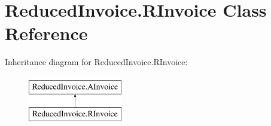 \hypertarget{class_reduced_invoice_1_1_r_invoice}{\section{Reduced\-Invoice.\-R\-Invoice Class Reference}
\label{class_reduced_invoice_1_1_r_invoice}
}
Inheritance diagram for Reduced\-Invoice.\-R\-Invoice\-:\begin{figure}[H]
\begin{center}
\leavevmode
\includegraphics[height=2.000000cm]{class_reduced_invoice_1_1_r_invoice}
\end{center}
\end{figure}
